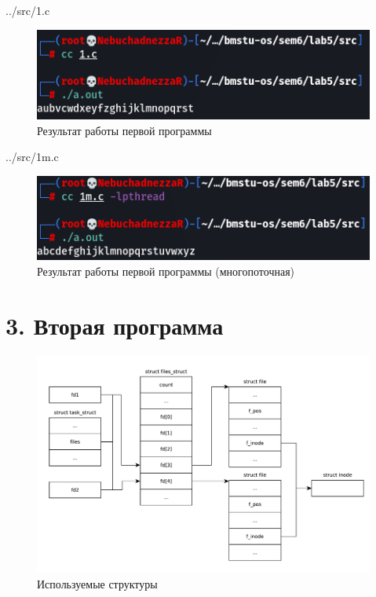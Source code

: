 \clearpage

\begin{lstinputlisting}[
	caption={Исходный код первой программы},
	style={c},
	]{../src/1.c}
\end{lstinputlisting}

\begin{figure}[h!btp]
	\centering
	\includegraphics[width=400pt]{inc/1.png}
	\caption{Результат работы первой программы}
	\label{fig:res1}	
\end{figure}

\clearpage

\begin{lstinputlisting}[
	caption={Исходный код первой программы (многопоточная)},
	style={c},
	]{../src/1m.c}
\end{lstinputlisting}

\begin{figure}[h!btp]
	\centering
	\includegraphics[width=400pt]{inc/1m.png}
	\caption{Результат работы первой программы (многопоточная)}
	\label{fig:res1m}	
\end{figure}

\clearpage

\section*{3. Вторая программа}

\begin{figure}[h!btp]
	\centering
	\includegraphics[width=490pt]{inc/scheme2.pdf}
	\caption{Используемые структуры}
	\label{fig:scheme2}	
\end{figure}

